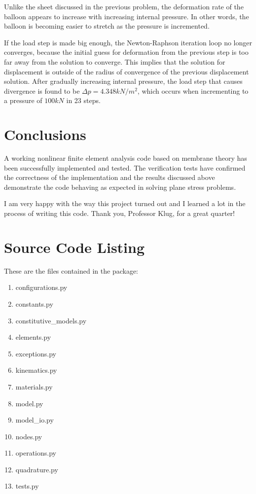 \documentclass[]{spie}  %
\begin{document}
Unlike the sheet discussed in the previous problem, the deformation rate of the balloon appears to increase with increasing internal pressure. In other words, the balloon is becoming easier to stretch as the pressure is incremented. 

If the load step is made big enough, the Newton-Raphson iteration loop no longer converges, because the initial guess for deformation from the previous step is too far away from the solution to converge. This implies that the solution for displacement is outside of the radius of convergence of the previous displacement solution. After gradually increasing internal pressure, the load step that causes divergence is found to be $\Delta p = 4.348 kN/m^2$, which occurs when incrementing to a pressure of $100 kN$ in 23 steps.  

\section{Conclusions}
A working nonlinear finite element analysis code based on membrane theory has been successfully implemented and tested. The verification tests have confirmed the correctness of the implementation and the results discussed above demonstrate the code behaving as expected in solving plane stress problems. 

I am very happy with the way this project turned out and I learned a lot in the process of writing this code. Thank you, Professor Klug, for a great quarter!

\section{Source Code Listing}
These are the files contained in the package:
\begin{enumerate}
	\item configurations.py
	\item constants.py
	\item constitutive\_models.py
	\item elements.py
	\item exceptions.py
	\item kinematics.py
	\item materials.py 
	\item model.py
	\item model\_io.py
	\item nodes.py
	\item operations.py
	\item quadrature.py
	\item tests.py
\end{enumerate}
\end{document}
